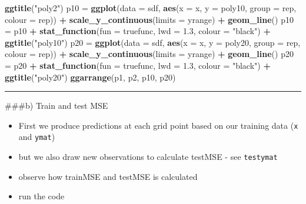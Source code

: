 \documentclass[]{article}
\newenvironment{Shaded}{\begin{snugshade}}{\end{snugshade}}
\newcommand{\DataTypeTok}[1]{\textcolor[rgb]{0.13,0.29,0.53}{#1}}
\newcommand{\FloatTok}[1]{\textcolor[rgb]{0.00,0.00,0.81}{#1}}
\newcommand{\KeywordTok}[1]{\textcolor[rgb]{0.13,0.29,0.53}{\textbf{#1}}}
\newcommand{\NormalTok}[1]{#1}
\newcommand{\OperatorTok}[1]{\textcolor[rgb]{0.81,0.36,0.00}{\textbf{#1}}}
\newcommand{\StringTok}[1]{\textcolor[rgb]{0.31,0.60,0.02}{#1}}
\providecommand{\tightlist}{%
  \setlength{\itemsep}{0pt}\setlength{\parskip}{0pt}}
\begin{document}
\begin{Shaded}
\begin{Highlighting}[]
\StringTok{    }\KeywordTok{ggtitle}\NormalTok{(}\StringTok{"poly2"}\NormalTok{)}
\NormalTok{p10 =}\StringTok{ }\KeywordTok{ggplot}\NormalTok{(}\DataTypeTok{data =}\NormalTok{ sdf, }\KeywordTok{aes}\NormalTok{(}\DataTypeTok{x =}\NormalTok{ x, }\DataTypeTok{y =}\NormalTok{ poly10, }\DataTypeTok{group =}\NormalTok{ rep, }\DataTypeTok{colour =}\NormalTok{ rep)) }\OperatorTok{+}\StringTok{ }
\StringTok{    }\KeywordTok{scale_y_continuous}\NormalTok{(}\DataTypeTok{limits =}\NormalTok{ yrange) }\OperatorTok{+}\StringTok{ }\KeywordTok{geom_line}\NormalTok{()}
\NormalTok{p10 =}\StringTok{ }\NormalTok{p10 }\OperatorTok{+}\StringTok{ }\KeywordTok{stat_function}\NormalTok{(}\DataTypeTok{fun =}\NormalTok{ truefunc, }\DataTypeTok{lwd =} \FloatTok{1.3}\NormalTok{, }\DataTypeTok{colour =} \StringTok{"black"}\NormalTok{) }\OperatorTok{+}\StringTok{ }
\StringTok{    }\KeywordTok{ggtitle}\NormalTok{(}\StringTok{"poly10"}\NormalTok{)}
\NormalTok{p20 =}\StringTok{ }\KeywordTok{ggplot}\NormalTok{(}\DataTypeTok{data =}\NormalTok{ sdf, }\KeywordTok{aes}\NormalTok{(}\DataTypeTok{x =}\NormalTok{ x, }\DataTypeTok{y =}\NormalTok{ poly20, }\DataTypeTok{group =}\NormalTok{ rep, }\DataTypeTok{colour =}\NormalTok{ rep)) }\OperatorTok{+}\StringTok{ }
\StringTok{    }\KeywordTok{scale_y_continuous}\NormalTok{(}\DataTypeTok{limits =}\NormalTok{ yrange) }\OperatorTok{+}\StringTok{ }\KeywordTok{geom_line}\NormalTok{()}
\NormalTok{p20 =}\StringTok{ }\NormalTok{p20 }\OperatorTok{+}\StringTok{ }\KeywordTok{stat_function}\NormalTok{(}\DataTypeTok{fun =}\NormalTok{ truefunc, }\DataTypeTok{lwd =} \FloatTok{1.3}\NormalTok{, }\DataTypeTok{colour =} \StringTok{"black"}\NormalTok{) }\OperatorTok{+}\StringTok{ }
\StringTok{    }\KeywordTok{ggtitle}\NormalTok{(}\StringTok{"poly20"}\NormalTok{)}
\KeywordTok{ggarrange}\NormalTok{(p1, p2, p10, p20)}
\end{Highlighting}
\end{Shaded}

\begin{center}\rule{0.5\linewidth}{\linethickness}\end{center}

\#\#\#b) Train and test MSE

\begin{itemize}
\tightlist
\item
  First we produce predictions at each grid point based on our training
  data (\texttt{x} and \texttt{ymat})
\item
  but we also draw new observations to calculate testMSE - see
  \texttt{testymat}
\item
  observe how trainMSE and testMSE is calculated
\item
  run the code
\end{itemize}
\end{document}
